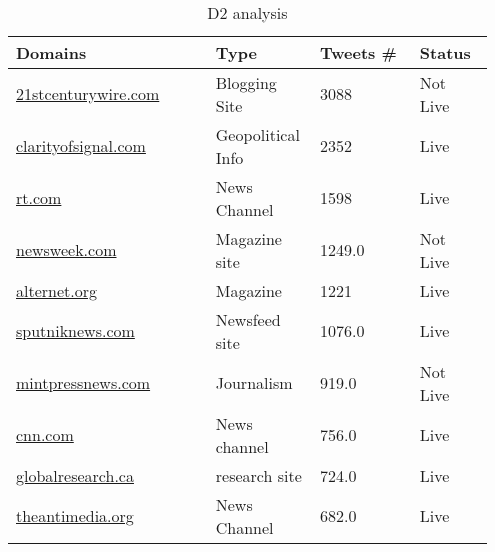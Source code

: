 \documentclass[12pt]{article}
\begin{document}
\\
\begin{table}[h]
\centering
\caption{D2 analysis}
\label{tbl:simple}
\begin{tabular}{p{0.40\linewidth}p{0.20\linewidth}p{0.20\linewidth}p{0.15\linewidth}}
\hline
\textbf{Domains} & \textbf{Type} & \textbf{Tweets #} & \textbf{Status} \\ \hline \hline
\url{21stcenturywire.com} & Blogging Site & 3088 & Not Live \\ \hline
\url{clarityofsignal.com} & Geopolitical Info & 2352 & Live \\ \hline
\url{rt.com} & News Channel & 1598 & Live \\ \hline
\url{newsweek.com} & Magazine site & 1249.0 & Not Live \\ \hline
\url{alternet.org} & Magazine & 1221 & Live \\ \hline
\url{sputniknews.com} & Newsfeed site & 1076.0 & Live \\ \hline
\url{mintpressnews.com} & Journalism & 919.0 & Not Live \\ \hline
\url{cnn.com} & News channel & 756.0 & Live \\ \hline
\url{globalresearch.ca} & research site & 724.0 & Live \\ \hline
\url{theantimedia.org} & News Channel & 682.0 & Live \\ \hline \hline

\end{tabular}
\end{table}

\clearpage
\end{document}
